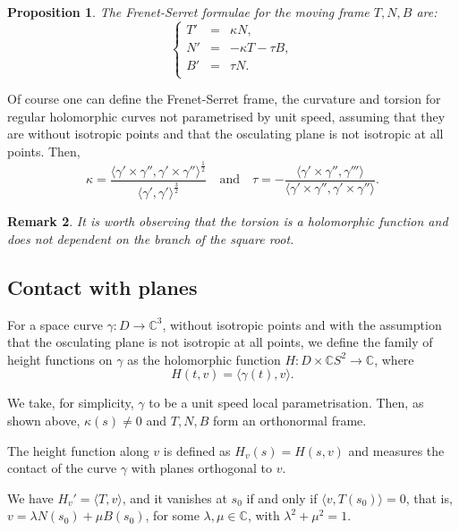 \documentclass[12pt,a4paper]{article}
\newtheorem{prop}{Proposition}[section]
\newtheorem{rem}[prop]{Remark}
\begin{document}
\begin{prop} The Frenet-Serret formulae for the moving frame $T,N,B$ are:
$$
\left\{ \begin{array}{rcl}
T'&=&\kappa N,\\
N'&=&-\kappa T-\tau B,\\
B'&=&\tau N.\\
\end{array}
\right.
$$	
\end{prop}

Of course one can define the Frenet-Serret frame, the curvature and torsion for regular holomorphic curves not parametrised by unit speed, assuming that they are without isotropic points and that the osculating plane is not isotropic at all points.
Then,  
$$
\kappa=\dfrac{\langle \gamma' \times \gamma'', {\gamma' \times \gamma''}\rangle^{\frac{1}{2}}}{\langle\gamma', {\gamma'}\rangle^{\frac{3}{2}}}   
\quad \mbox{and}  \quad 
\tau=-\frac{\langle \gamma' \times \gamma'', {\gamma'''}\rangle}{\langle \gamma' \times \gamma'', {\gamma' \times \gamma''}\rangle}.
$$

\begin{rem}\label{rem:tors}
{\rm 
It is worth observing that the torsion is a holomorphic function and does not dependent on the branch of the square root.
}
\end{rem}
\subsection{Contact with planes}\label{ss:contactPlanesCurves}

For a space curve $\gamma:D\to \mathbb C^3$, without isotropic points and with the assumption that the osculating plane is not isotropic at all points, 
we define the family of height functions on $\gamma$ as the holomorphic function
$H:D\times \mathbb CS^2\to \mathbb C$, where
$$
H(t,v)=\langle \gamma(t),{v}\rangle.
$$

We take, for simplicity, $\gamma$ to be a unit speed local parametrisation. 
Then, as shown above, $\kappa(s)\ne 0$ and  $T,N,B$ form an orthonormal frame.

The  height function along $v$ is defined as $H_v(s)=H(s,v)$ and measures the contact of the curve $\gamma$ with planes  orthogonal to $v$.

We have $H_v'=\langle T,{v}\rangle$, and it vanishes at $s_0$ if and only if $\langle v,{T(s_0)}\rangle=0$, that is, $v=\lambda N(s_0)+\mu B(s_0)$, for some $\lambda, \mu\in \mathbb C$, with $\lambda^2+\mu^2=1$.
\end{document}
